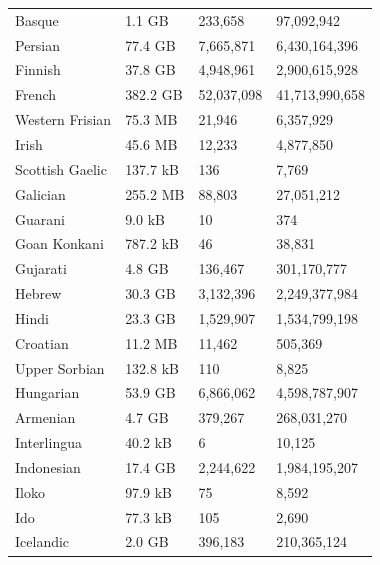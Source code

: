 \begin{table}[t!]
\begin{tabular}{llll}
        Basque                      & 1.1 GB    & 233,658     & 97,092,942      \\
        Persian                     & 77.4 GB   & 7,665,871   & 6,430,164,396   \\
        Finnish                     & 37.8 GB   & 4,948,961   & 2,900,615,928   \\
        French                      & 382.2 GB  & 52,037,098  & 41,713,990,658  \\
        Western Frisian             & 75.3 MB   & 21,946      & 6,357,929       \\
        Irish                       & 45.6 MB   & 12,233      & 4,877,850       \\
        Scottish Gaelic             & 137.7 kB  & 136         & 7,769           \\
        Galician                    & 255.2 MB  & 88,803      & 27,051,212      \\
        Guarani                     & 9.0 kB    & 10          & 374             \\
        Goan Konkani                & 787.2 kB  & 46          & 38,831          \\
        Gujarati                    & 4.8 GB    & 136,467     & 301,170,777     \\
        Hebrew                      & 30.3 GB   & 3,132,396   & 2,249,377,984   \\
        Hindi                       & 23.3 GB   & 1,529,907   & 1,534,799,198   \\
        Croatian                    & 11.2 MB   & 11,462      & 505,369         \\
        Upper Sorbian               & 132.8 kB  & 110         & 8,825           \\
        Hungarian                   & 53.9 GB   & 6,866,062   & 4,598,787,907   \\
        Armenian                    & 4.7 GB    & 379,267     & 268,031,270     \\
        Interlingua                 & 40.2 kB   & 6           & 10,125          \\
        Indonesian                  & 17.4 GB   & 2,244,622   & 1,984,195,207   \\
        Iloko                       & 97.9 kB   & 75          & 8,592           \\
        Ido                         & 77.3 kB   & 105         & 2,690           \\
        Icelandic                   & 2.0 GB    & 396,183     & 210,365,124     \\

\end{tabular}
\end{table}
